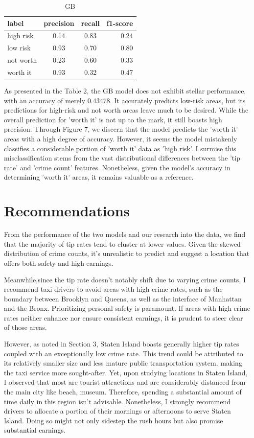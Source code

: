 \documentclass[11pt]{article}
\begin{document}
\begin{table}[h]
\centering
\caption{GB}
\label{table:example}
\begin{tabular}{|l|c|c|r|}
\hline
label & precision & recall & f1-score\\
\hline
high risk & 0.14 & 0.83 & 0.24\\
low risk & 0.93 & 0.70 & 0.80\\
not worth & 0.23 & 0.60 & 0.33\\
worth it & 0.93 & 0.32 & 0.47\\
\hline
\end{tabular}
\end{table}

As presented in the Table 2, the GB model does not exhibit stellar performance, with an accuracy of merely 0.43478. It accurately predicts low-risk areas, but its predictions for high-risk and not worth areas leave much to be desired. While the overall prediction for 'worth it' is not up to the mark, it still boasts high precision. Through Figure 7, we discern that the model predicts the 'worth it' areas with a high degree of accuracy. However, it seems the model mistakenly classifies a considerable portion of 'worth it' data as 'high risk'. I surmise this misclassification stems from the vast distributional differences between the 'tip rate' and 'crime count' features. Nonetheless, given the model's accuracy in determining 'worth it' areas, it remains valuable as a reference.
\section{Recommendations}
From the performance of the two models and our research into the data, we find that the majority of tip rates tend to cluster at lower values. Given the skewed distribution of crime counts, it's unrealistic to predict and suggest a location that offers both safety and high earnings.

Meanwhile,since the tip rate doesn't notably shift due to varying crime counts, I recommend taxi drivers to avoid areas with high crime rates, such as the boundary between Brooklyn and Queens, as well as the interface of Manhattan and the Bronx. Prioritizing personal safety is paramount. If areas with high crime rates neither enhance nor ensure consistent earnings, it is prudent to steer clear of those areas.

However, as noted in Section 3, Staten Island boasts generally higher tip rates coupled with an exceptionally low crime rate. This trend could be attributed to its relatively smaller size and less mature public transportation system, making the taxi service more sought-after. Yet, upon studying locations in Staten Island, I observed that most are tourist attractions and are considerably distanced from the main city like beach, museum. Therefore, spending a substantial amount of time daily in this region isn't advisable. Nonetheless, I strongly recommend drivers to allocate a portion of their mornings or afternoons to serve Staten Island. Doing so might not only sidestep the rush hours but also promise substantial earnings.
\end{document}
